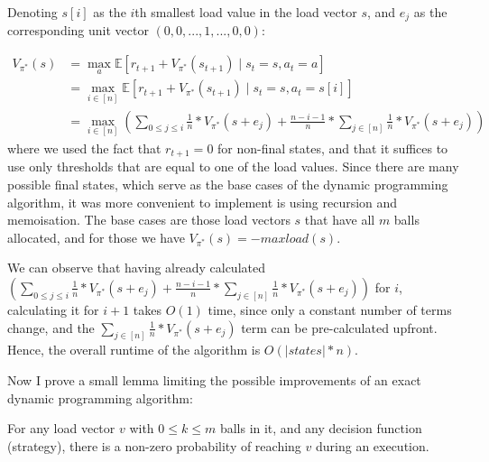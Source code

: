 Denoting $s[i]$ as the $i$th smallest load value in the load vector $s$, and $e_j$ as the corresponding unit vector $(0, 0, ... , 1, ..., 0, 0)$: 

\begin{equation} \label{eq:twothinning-dynamicprogramming}
\begin{split}
    V_{\pi^*}(s) &= \max_a \mathbb{E} [r_{t+1} + V_{\pi^*}(s_{t+1}) \mid s_t=s, a_t=a] \\
    &= \max_{i \in [n]} \mathbb{E} [r_{t+1} + V_{\pi^*}(s_{t+1}) \mid s_t=s, a_t=s[i]] \\
    &= \max_{i \in [n]} (\sum_{0\leq j \leq i} \frac{1}{n}*V_{\pi^*}(s+e_j) + \frac{n-i-1}{n} * \sum_{j \in [n]} \frac{1}{n}*V_{\pi^*}(s+e_j))
\end{split}
\end{equation}
where we used the fact that $r_{t+1}=0$ for non-final states, and that it suffices to use only thresholds that are equal to one of the load values. Since there are many possible final states, which serve as the base cases of the dynamic programming algorithm, it was more convenient to implement is using recursion and memoisation. The base cases are those load vectors $s$ that have all $m$ balls allocated, and for those we have $V_{\pi^*}(s)=-maxload(s)$. 


We can observe that having already calculated $(\sum_{0\leq j \leq i} \frac{1}{n}*V_{\pi^*}(s+e_j) + \frac{n-i-1}{n} * \sum_{j \in [n]} \frac{1}{n}*V_{\pi^*}(s+e_j))$ for $i$, calculating it for $i+1$ takes $O(1)$ time, since only a constant number of terms change, and the $\sum_{j \in [n]} \frac{1}{n}*V_{\pi^*}(s+e_j)$ term can be pre-calculated upfront. Hence, the overall runtime of the algorithm is $O(|states|*n)$.\


Now I prove a small lemma limiting the possible improvements of an exact dynamic programming algorithm:


\begin{lemma} \label{lemma: everystatereachable}
For any load vector $v$ with $0\leq k\leq m$ balls in it, and any decision function (strategy), there is a non-zero probability of reaching $v$ during an execution.
\end{lemma}

